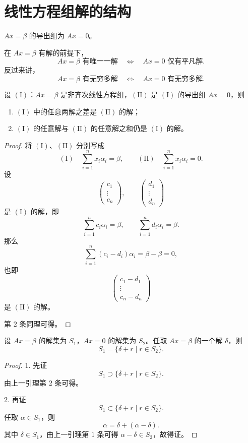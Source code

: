 \section{线性方程组解的结构}

\begin{definition}\label{p1:concept:c2-l1057}
	$Ax=\beta$ 的导出组为 $Ax=0$。
	
	
\end{definition}
在 $Ax=\beta$ 有解的前提下，
	\[
	Ax=\beta \text{ 有唯一一解}
	\quad\Longleftrightarrow\quad
	Ax=0 \text{ 仅有平凡解}.
	\]
	反过来讲，
	\[
	Ax=\beta \text{ 有无穷多解}
	\quad\Longleftrightarrow\quad
	Ax=0 \text{ 有无穷多解}.
	\]
\begin{lemma}
	设 $(\mathrm{I})$：$Ax=\beta$ 是非齐次线性方程组，$(\mathrm{II})$ 是 $(\mathrm{I})$ 的导出组 $Ax=0$，则
	\begin{enumerate}
		\item $(\mathrm{I})$ 中的任意两解之差是 $(\mathrm{II})$ 的解；
		\item $(\mathrm{I})$ 的任意解与 $(\mathrm{II})$ 的任意解之和仍是 $(\mathrm{I})$ 的解。
	\end{enumerate}
\end{lemma}
\begin{proof}
	将 $(\mathrm{I})$、$(\mathrm{II})$ 分别写成
	\[
	(\mathrm{I})\quad \sum_{i=1}^n x_i\alpha_i=\beta,
	\qquad
	(\mathrm{II})\quad \sum_{i=1}^n x_i\alpha_i=0.
	\]
	设
	\[
	\begin{pmatrix}
		c_1\\
		\vdots\\
		c_n
	\end{pmatrix},
	\qquad
	\begin{pmatrix}
		d_1\\
		\vdots\\
		d_n
	\end{pmatrix}
	\]
	是 $(\mathrm{I})$ 的解，即
	\[
	\sum_{i=1}^n c_i\alpha_i=\beta,
	\qquad
	\sum_{i=1}^n d_i\alpha_i=\beta.
	\]
	那么
	\[
	\sum_{i=1}^n(c_i-d_i)\alpha_i=\beta-\beta=0,
	\]
	也即
	\[
	\begin{pmatrix}
		c_1-d_1\\
		\vdots\\
		c_n-d_n
	\end{pmatrix}
	\]
	是 $(\mathrm{II})$ 的解。
	
	第 $2$ 条同理可得。
\end{proof}

\begin{corollary}
	设 $Ax=\beta$ 的解集为 $S_1$，$Ax=0$ 的解集为 $S_2$。任取 $Ax=\beta$ 的一个解 $\delta$，则
	\[
	S_1=\{\delta+r\mid r\in S_2\}.
	\]
\end{corollary}
\begin{proof}
	$1.$ 先证
	\[
	S_1\supset \{\delta+r\mid r\in S_2\}.
	\]
	由上一引理第 $2$ 条可得。
	
	$2.$ 再证
	\[
	S_1\subset \{\delta+r\mid r\in S_2\}.
	\]
	任取 $\alpha\in S_1$，则
	\[
	\alpha=\delta+(\alpha-\delta).
	\]
	其中 $\delta\in S_1$，由上一引理第 $1$ 条可得 $\alpha-\delta\in S_2$，故得证。
\end{proof}

